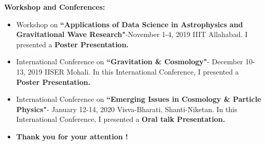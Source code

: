 \documentclass[xcolor=table,bigger]{beamer}
\begin{document}
\begin{frame}
 
 {\color{blue}\Large \textbf{Workshop and Conferences:}}
 
\vspace{3mm}
  \begin{itemize}
 \item[\ding{74}]
Workshop on \textbf{``Applications of Data Science in Astrophysics and Gravitational Wave Research"}-November 1-4, 2019 IIIT Allahabad. I presented a \textbf{Poster Presentation.}
\vspace{3mm}\\
\item[\ding{74}]
International Conference on \textbf{``Gravitation \& Cosmology"}- December 10-13, 2019 IISER Mohali. In this International Conference, I presented a \textbf{Poster Presentation.}
\vspace{3mm}\\
\item[\ding{74}]
International Conference on \textbf{``Emerging Issues in Cosmology \& Particle Physics"}- January 12-14, 2020 Visva-Bharati, Shanti-Niketan. In this International Conference, I presented a \textbf{Oral talk Presentation.}
\vspace{8mm}\\
\item[]
\begin{center}
\textbf{Thank you for your attention !}
\end{center}
\end{itemize}
\end{frame}
\end{document}
